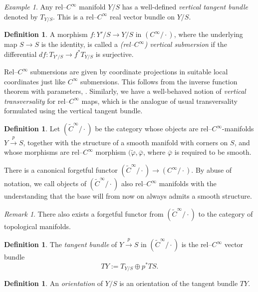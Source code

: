 \documentclass[11pt,psamsfonts, oneside, reqno]{amsart}
\newcommand{\cl}{\colon}
\newcommand{\xra}{\xrightarrow}
\newcommand{\wt}{\widetilde}
\theoremstyle{definition}
\newtheorem{definition}[theorem]{Definition}
\theoremstyle{remark}
\newtheorem{remark}[theorem]{Remark}
\newtheorem{example}[theorem]{Example}
\numberwithin{equation}{section}
\begin{document}
\begin{example}
	Any rel--$C^\infty$ manifold $Y/S$ has a well-defined \emph{vertical tangent bundle} denoted by $T_{Y/S}$. This is a rel--$C^\infty$ real vector bundle on $Y/S$.
\end{example}


\begin{definition}
	A morphism $f\cl Y'/S\to Y/S$ in $(C^\infty/\cdot)$, where the underlying map $S\to S$ is the identity, is called a \emph{(rel--$C^\infty$) vertical submersion} if the differential $df\cl T_{Y'/S}\to f^*T_{Y/S}$ is surjective.
\end{definition}


\noindent
Rel--$C^\infty$ submersions are given by coordinate projections in suitable local coordinates just like $C^\infty$ submersions. This follows from the inverse function theorem with parameters, \cite[Lemma 5.10]{Swa21}. Similarly, we have a well-behaved notion of \emph{vertical transversality} for rel--$C^\infty$ maps, which is the analogue of usual transversality formulated using the vertical tangent bundle.

\begin{definition}\label{} Let $(\wt{C}^\infty/\cdot)$ be the category whose objects are rel--$C^\infty$-manifolds $Y\xra{p} S$, together with the structure of a smooth manifold with corners on $S$, and whose morphisms are rel--$C^\infty$ morphism $(\wt\varphi,\bar{\varphi}$, where $\bar{\varphi}$ is required to be smooth.
\end{definition}

\noindent
There is a canonical forgetful functor $(\wt{C}^\infty/\cdot)\to (C^\infty/\cdot)$. By abuse of notation, we call objects of $(\wt{C}^\infty/\cdot)$ also rel--$C^\infty$ manifolds with the understanding that the base will from now on always admits a smooth structure.

\begin{remark}\label{} There also exists a forgetful functor from $(\wt{C}^\infty/\cdot)$ to the category of topological manifolds.\end{remark}


\begin{definition}\label{de:tangent-bundle} The \emph{tangent bundle} of $Y\xra{p} S$ in $(\wt{C}^\infty/\cdot)$ is the rel--$C^\infty$ vector bundle $$TY := T_{Y/S}\oplus p^*TS.$$
\end{definition}

\begin{definition}\label{} An \emph{orientation} of $Y/S$ is an orientation of the tangent bundle $TY$.\end{definition}
\end{document}
